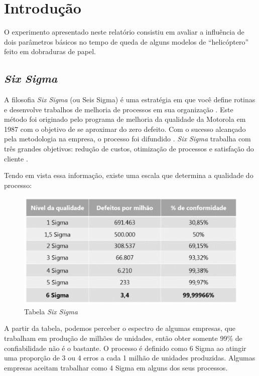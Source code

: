 \section{Introdução}

O experimento apresentado neste relatório consistiu em avaliar a influência de dois parâmetros básicos no tempo de queda de alguns modelos de ``helicóptero'' feito em dobraduras de papel.

\subsection{\textit{Six Sigma}}

A filosofia \textit{Six Sigma} (ou Seis Sigma) é uma estratégia em que você define rotinas e desenvolve trabalhos de melhoria de processos em sua organização \cite{sixsigma}. Este método foi originado pelo programa de melhoria da qualidade da Motorola em 1987 com o objetivo de se aproximar do zero defeito. Com o sucesso alcançado pela metodologia na empresa, o processo foi difundido \cite{correa}. \textit{Six Sigma} trabalha com três grandes objetivos: redução de custos, otimização de processos e satisfação do cliente \cite{sixsigma}.

Tendo em vista essa informação, existe uma escala que determina a qualidade do processo:

\begin{figure}[h]
  \centering
  \includegraphics[scale=0.7]{images/tabless.png}
  \caption{Tabela \emph{Six Sigma} \cite{sixsigma}}
  \label{fig:sixsigma}
\end{figure}

A partir da tabela, podemos perceber o espectro de algumas empresas, que trabalham em produção de milhões de unidades, então obter somente 99\% de confiabilidade não é o bastante. O processo é definido como 6 Sigma ao atingir uma proporção de 3 ou 4 erros a cada 1 milhão de unidades produzidas. Algumas empresas aceitam trabalhar como 4 Sigma em alguns dos seus processos.

